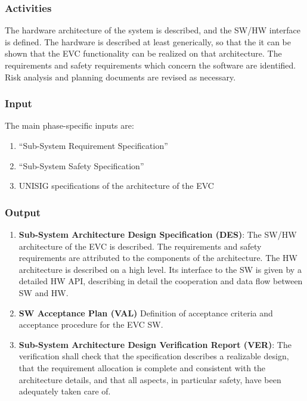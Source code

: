 \documentclass{template/openetcs_article}
\begin{document}
\subsubsection{Activities}
\label{sec:2-activities}
The hardware architecture of the system is described, and the SW/HW
interface is defined.  The hardware is described at least generically,
so that the it can be shown that the EVC functionality can be realized
on that architecture. The requirements and safety requirements which
concern the software are identified. Risk analysis and planning
documents are revised as necessary.

\subsubsection{Input}
\label{sec:2-input}

The main phase-specific inputs are:
\begin{enumerate}
\item ``Sub-System Requirement Specification''
\item ``Sub-System Safety Specification''
\item UNISIG specifications of the architecture of the EVC
\end{enumerate}

\subsubsection{Output}
\label{sec:2-output}

\begin{enumerate}
\item \textbf{Sub-System Architecture Design Specification (DES)}: The
  SW/HW architecture of the EVC is described. The requirements and
  safety requirements are attributed to the components of the
  architecture. The HW architecture is described on a high level. Its
  interface to the SW is given by a detailed HW API, describing in
  detail the cooperation and data flow between SW and HW.
\item \textbf{SW Acceptance Plan (VAL)} Definition of acceptance criteria and
  acceptance procedure for the EVC SW.  
\item \textbf{Sub-System Architecture Design Verification Report (VER)}: The
  verification shall check that the specification describes a
  realizable design, that the requirement allocation is complete
  and consistent with the architecture details, and that all aspects,
  in particular safety, have been adequately taken care of.
\end{enumerate}
\end{document}

